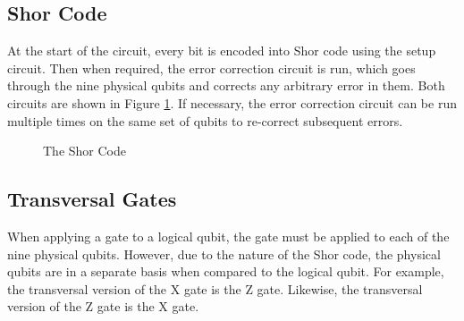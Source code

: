 \documentclass[letterpaper]{article}
\begin{document}
\subsection{Shor Code}

At the start of the circuit, every bit is encoded into Shor code using the setup circuit. Then when required, the error correction circuit is run, which goes through the nine physical qubits and corrects any arbitrary error in them. Both circuits are shown in Figure \ref{fig:shor-gates}. If necessary, the error correction circuit can be run multiple times on the same set of qubits to re-correct subsequent errors.

\begin{figure}[H]%
    \centering%
    \qquad%
    \caption{The Shor Code}%
    \label{fig:shor-gates}%
\end{figure}

\subsection{Transversal Gates}

When applying a gate to a logical qubit, the gate must be applied to each of the nine physical qubits. However, due to the nature of the Shor code, the physical qubits are in a separate basis when compared to the logical qubit. For example, the transversal version of the X gate is the Z gate. Likewise, the transversal version of the Z gate is the X gate.
\end{document}
